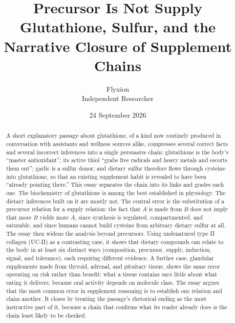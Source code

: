 \documentclass[11pt,a4paper]{article}
\title{\textbf{Precursor Is Not Supply}\\[0.4em]
\large Glutathione, Sulfur, and the Narrative Closure of Supplement Chains}
\author{Flyxion\\ \small Independent Researcher}
\date{24 September 2026}
\theoremstyle{plain}
\theoremstyle{definition}
\theoremstyle{remark}
\begin{document}
\maketitle

\begin{abstract}
\noindent
A short explanatory passage about glutathione, of a kind now routinely produced in conversation with assistants and wellness sources alike, compresses several correct facts and several incorrect inferences into a single persuasive chain: glutathione is the body's ``master antioxidant''; its active thiol ``grabs free radicals and heavy metals and escorts them out''; garlic is a sulfur donor; and dietary sulfur therefore flows through cysteine into glutathione, so that an existing supplement habit is revealed to have been ``already pointing there.'' This essay separates the chain into its links and grades each one. The biochemistry of glutathione is among the best established in physiology. The dietary inferences built on it are mostly not. The central error is the substitution of a precursor relation for a supply relation: the fact that $A$ is made from $B$ does not imply that more $B$ yields more $A$, since synthesis is regulated, compartmented, and saturable, and since humans cannot build cysteine from arbitrary dietary sulfur at all. The essay then widens the analysis beyond precursors. Using undenatured type II collagen (UC-II) as a contrasting case, it shows that dietary compounds can relate to the body in at least six distinct ways (composition, precursor, supply, induction, signal, and tolerance), each requiring different evidence. A further case, glandular supplements made from thyroid, adrenal, and pituitary tissue, shows the same error operating on risk rather than benefit: what a tissue contains says little about what eating it delivers, because oral activity depends on molecule class. The essay argues that the most common error in supplement reasoning is to establish one relation and claim another. It closes by treating the passage's rhetorical ending as the most instructive part of it, because a chain that confirms what its reader already does is the chain least likely to be checked.
\end{abstract}
\end{document}
